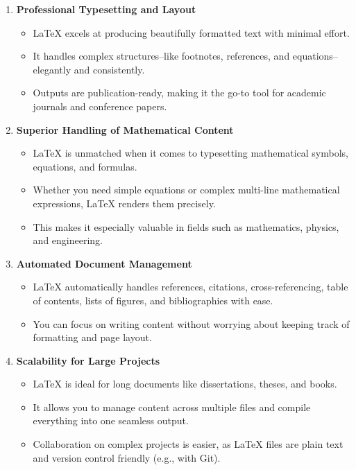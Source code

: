 \documentclass[12pt, oneside]{article}
\begin{document}
\begin{enumerate}
    \item \textbf{Professional Typesetting and Layout}
    \begin{itemize}
        \item \LaTeX{} excels at producing beautifully formatted text with minimal effort.
        \item It handles complex structures--like footnotes, references, and equations--elegantly and consistently.
        \item Outputs are publication-ready, making it the go-to tool for academic journals and conference papers.
    \end{itemize}
    
    \item \textbf{Superior Handling of Mathematical Content}
    \begin{itemize}
        \item \LaTeX{} is unmatched when it comes to typesetting mathematical symbols, equations, and formulas.
        \item Whether you need simple equations or complex multi-line mathematical expressions, \LaTeX{} renders them precisely.
        \item This makes it especially valuable in fields such as mathematics, physics, and engineering.
    \end{itemize}
    
    \item \textbf{Automated Document Management}
    \begin{itemize}
        \item \LaTeX{} automatically handles references, citations, cross-referencing, table of contents, lists of figures, and bibliographies with ease.
        \item You can focus on writing content without worrying about keeping track of formatting and page layout.
    \end{itemize}

    \item \textbf{Scalability for Large Projects}
    \begin{itemize}
        \item \LaTeX{} is ideal for long documents like dissertations, theses, and books.
        \item It allows you to manage content across multiple files and compile everything into one seamless output.
        \item Collaboration on complex projects is easier, as \LaTeX{} files are plain text and version control friendly (e.g., with Git).
    \end{itemize}


\end{enumerate}
\end{document}
